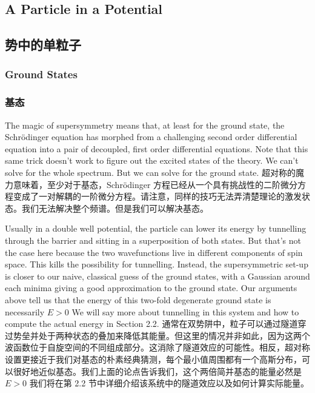 \documentclass{article}
\begin{document}
\begin{paracol}{2}
\subsection{A Particle in a Potential}
\switchcolumn
\subsection*{势中的单粒子}
\switchcolumn*

\subsubsection{Ground States}
\switchcolumn
\subsubsection*{基态}
\switchcolumn*

The magic of supersymmetry means that, at least for the ground state, the Schrödinger equation has morphed from a challenging second order differential equation into a pair of decoupled, first order differential equations. Note that this same trick doesn't work to figure out the excited states of the theory. We can't solve for the whole spectrum. But we can solve for the ground state.
\switchcolumn
超对称的魔力意味着，至少对于基态，Schrödinger 方程已经从一个具有挑战性的二阶微分方程变成了一对解耦的一阶微分方程。请注意，同样的技巧无法弄清楚理论的激发状态。我们无法解决整个频谱。但是我们可以解决基态。
\switchcolumn*

Usually in a double well potential, the particle can lower its energy by tunnelling through the barrier and sitting in a superposition of both states. But that's not the case here because the two wavefunctions live in different components of spin space. This kills the possibility for tunnelling. Instead, the supersymmetric set-up is closer to our naive, classical guess of the ground states, with a Gaussian around each minima giving a good approximation to the ground state. Our arguments above tell us that the energy of this two-fold degenerate ground state is necessarily $E > 0$ We will say more about tunnelling in this system and how to compute the actual energy in Section 2.2.
\switchcolumn
通常在双势阱中，粒子可以通过隧道穿过势垒并处于两种状态的叠加来降低其能量。但这里的情况并非如此，因为这两个波函数位于自旋空间的不同组成部分。这消除了隧道效应的可能性。相反，超对称设置更接近于我们对基态的朴素经典猜测，每个最小值周围都有一个高斯分布，可以很好地近似基态。我们上面的论点告诉我们，这个两倍简并基态的能量必然是 $E > 0$ 我们将在第 2.2 节中详细介绍该系统中的隧道效应以及如何计算实际能量。
\switchcolumn*


\end{paracol}
\end{document}
